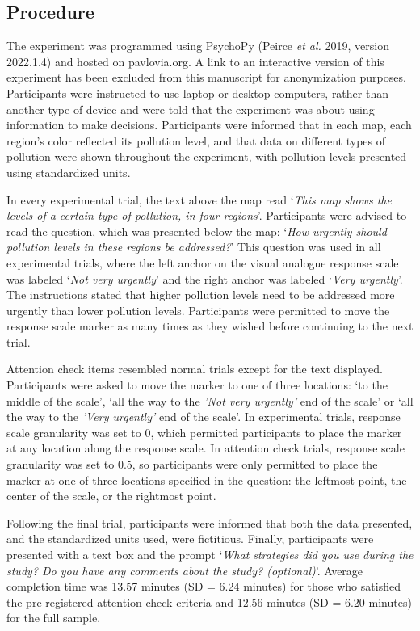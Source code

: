\documentclass[
]{interact}
\begin{document}
\hypertarget{procedure}{%
\subsection{Procedure}\label{procedure}}

The experiment was programmed using PsychoPy (Peirce \emph{et al.} 2019,
version 2022.1.4) and hosted on pavlovia.org. A link to an interactive
version of this experiment has been excluded from this manuscript for
anonymization purposes. Participants were instructed to use laptop or
desktop computers, rather than another type of device and were told that
the experiment was about using information to make decisions.
Participants were informed that in each map, each region's color
reflected its pollution level, and that data on different types of
pollution were shown throughout the experiment, with pollution levels
presented using standardized units.

In every experimental trial, the text above the map read `\emph{This map
shows the levels of a certain type of pollution, in four regions}'.
Participants were advised to read the question, which was presented
below the map: `\emph{How urgently should pollution levels in these
regions be addressed?}' This question was used in all experimental
trials, where the left anchor on the visual analogue response scale was
labeled `\emph{Not very urgently}' and the right anchor was labeled
`\emph{Very urgently}'. The instructions stated that higher pollution
levels need to be addressed more urgently than lower pollution levels.
Participants were permitted to move the response scale marker as many
times as they wished before continuing to the next trial.

Attention check items resembled normal trials except for the text
displayed. Participants were asked to move the marker to one of three
locations: `to the middle of the scale', `all the way to the \emph{'Not
very urgently'} end of the scale' or `all the way to the \emph{'Very
urgently'} end of the scale'. In experimental trials, response scale
granularity was set to 0, which permitted participants to place the
marker at any location along the response scale. In attention check
trials, response scale granularity was set to 0.5, so participants were
only permitted to place the marker at one of three locations specified
in the question: the leftmost point, the center of the scale, or the
rightmost point.

Following the final trial, participants were informed that both the data
presented, and the standardized units used, were fictitious. Finally,
participants were presented with a text box and the prompt `\emph{What
strategies did you use during the study? Do you have any comments about
the study? (optional)}'. Average completion time was 13.57 minutes (SD =
6.24 minutes) for those who satisfied the pre-registered attention check
criteria and 12.56 minutes (SD = 6.20 minutes) for the full sample.
\end{document}
